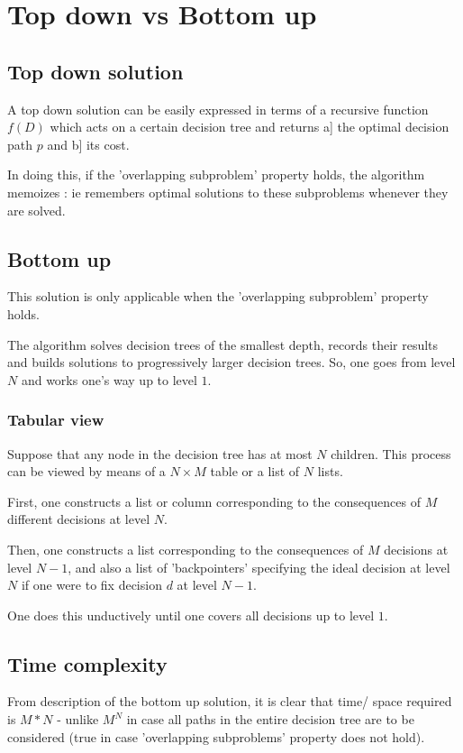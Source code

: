 \documentclass[oneside, article]{memoir}
\begin{document}
\section{Top down vs Bottom up}
\subsection{Top down solution}
A top down solution can be easily expressed in terms of a recursive function $f(D)$ which acts on a certain decision tree and returns a] the optimal decision path $p$ and b] its cost.

In doing this, if the 'overlapping subproblem' property holds, the algorithm memoizes : ie remembers optimal solutions to these subproblems whenever they are solved.

\subsection{Bottom up}
This solution is only applicable when the 'overlapping subproblem' property holds.

The algorithm solves decision trees of the smallest depth, records their results and builds solutions to progressively larger decision trees. So, one goes from level $N$ and works one's way up to level $1$.

\subsubsection{Tabular view}
Suppose that any node in the decision tree has at most $N$ children. This process can be viewed by means of a $N \times M$ table or a list of $N$ lists.

First, one constructs a list or column corresponding to the consequences of $M$ different decisions at level $N$.

Then, one constructs a list corresponding to the consequences of $M$ decisions at level $N-1$, and also a list of 'backpointers' specifying the ideal decision at level $N$ if one were to fix decision $d$ at level $N-1$.

One does this unductively until one covers all decisions up to level $1$.

\subsection{Time complexity}
From description of the bottom up solution, it is clear that time/ space required is $M*N$ - unlike $M^N$ in case all paths in the entire decision tree are to be considered (true in case 'overlapping subproblems' property does not hold).
\end{document}
